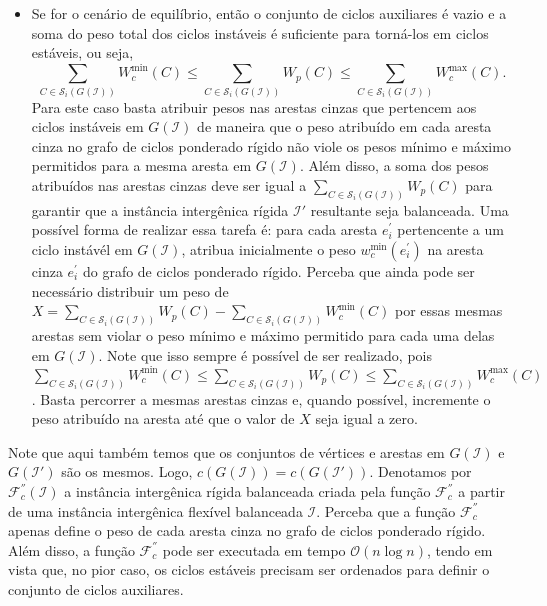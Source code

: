 \begin{itemize}
\begin{itemize}
    \item Se for o cenário de equilíbrio, então o conjunto de ciclos auxiliares é vazio e a soma do peso total dos ciclos instáveis é suficiente para torná-los em ciclos estáveis, ou seja, $$\sum_{C \in \mathcal{S}_i(G(\mathcal{I}))} W^{\min}_c(C) \le \sum_{C \in \mathcal{S}_i(G(\mathcal{I}))} W_p(C) \le \sum_{C \in \mathcal{S}_i(G(\mathcal{I}))} W^{\max}_c(C).$$ Para este caso basta atribuir pesos nas arestas cinzas que pertencem aos ciclos instáveis em $G(\mathcal{I})$ de maneira que o peso atribuído em cada aresta cinza no grafo de ciclos ponderado rígido não viole os pesos mínimo e máximo permitidos para a mesma aresta em $G(\mathcal{I})$. Além disso, a soma dos pesos atribuídos nas arestas cinzas deve ser igual a $\sum_{C \in \mathcal{S}_i(G(\mathcal{I}))} W_p(C)$ para garantir que a instância intergênica rígida $\mathcal{I}'$ resultante seja balanceada. Uma possível forma de realizar essa tarefa é: para cada aresta $e^{\prime}_i$ pertencente a um ciclo instávél em $G(\mathcal{I})$, atribua inicialmente o peso $w^{\min}_c(e^{\prime}_i)$ na aresta cinza $e^{\prime}_i$ do grafo de ciclos ponderado rígido. Perceba que ainda pode ser necessário distribuir um peso de $X = \sum_{C \in \mathcal{S}_i(G(\mathcal{I}))} W_p(C) - \sum_{C \in \mathcal{S}_i(G(\mathcal{I}))} W^{\min}_c(C)$ por essas mesmas arestas sem violar o peso mínimo e máximo permitido para cada uma delas em $G(\mathcal{I})$. Note que isso sempre é possível de ser realizado, pois $\sum_{C \in \mathcal{S}_i(G(\mathcal{I}))} W^{\min}_c(C) \le \sum_{C \in \mathcal{S}_i(G(\mathcal{I}))} W_p(C) \le \sum_{C \in \mathcal{S}_i(G(\mathcal{I}))} W^{\max}_c(C)$. Basta percorrer a mesmas arestas cinzas e, quando possível, incremente o peso atribuído na aresta até que o valor de $X$ seja igual a zero.
  \end{itemize}
\end{itemize}

Note que aqui também temos que os conjuntos de vértices e arestas em $G(\mathcal{I})$ e $G(\mathcal{I}')$ são os mesmos. Logo, $c(G(\mathcal{I})) = c(G(\mathcal{I}'))$. Denotamos por $\mathcal{F}_{c}^{''}(\mathcal{I})$ a instância intergênica rígida balanceada criada pela função $\mathcal{F}_{c}^{''}$ a partir de uma instância intergênica flexível balanceada $\mathcal{I}$. Perceba que a função $\mathcal{F}_{c}^{''}$ apenas define o peso de cada aresta cinza no grafo de ciclos ponderado rígido. Além disso, a função $\mathcal{F}_{c}^{''}$ pode ser executada em tempo $\mathcal{O}(n \log n)$, tendo em vista que, no pior caso, os ciclos estáveis precisam ser ordenados para definir o conjunto de ciclos auxiliares.

